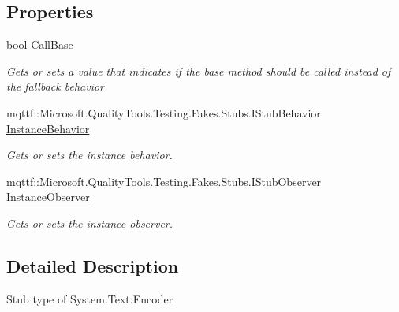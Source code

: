 \subsection*{Properties}
\begin{DoxyCompactItemize}
\item 
bool \hyperlink{class_system_1_1_text_1_1_fakes_1_1_stub_encoder_a9cff8d76e7092ed104426d4dda329f25}{Call\-Base}
\begin{DoxyCompactList}\small\item\em Gets or sets a value that indicates if the base method should be called instead of the fallback behavior\end{DoxyCompactList}\item 
mqttf\-::\-Microsoft.\-Quality\-Tools.\-Testing.\-Fakes.\-Stubs.\-I\-Stub\-Behavior \hyperlink{class_system_1_1_text_1_1_fakes_1_1_stub_encoder_aca6d8fe3bee2aaf14367e3fc7be4ec6a}{Instance\-Behavior}
\begin{DoxyCompactList}\small\item\em Gets or sets the instance behavior.\end{DoxyCompactList}\item 
mqttf\-::\-Microsoft.\-Quality\-Tools.\-Testing.\-Fakes.\-Stubs.\-I\-Stub\-Observer \hyperlink{class_system_1_1_text_1_1_fakes_1_1_stub_encoder_ab7b326c3abdb655eb1b68b0a4c507222}{Instance\-Observer}
\begin{DoxyCompactList}\small\item\em Gets or sets the instance observer.\end{DoxyCompactList}\end{DoxyCompactItemize}


\subsection{Detailed Description}
Stub type of System.\-Text.\-Encoder



